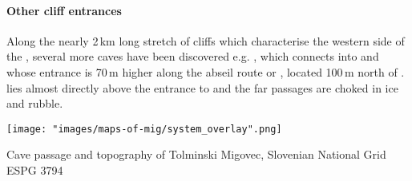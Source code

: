 \paragraph{Other cliff entrances} Along the nearly 2\,km long stretch of cliffs which characterise the western side of the , several more caves have been discovered e.g. , which connects into  and whose entrance is 70\,m higher along the abseil route or , located 100\,m north of .  lies almost directly above the entrance to  and the far passages are choked in ice and rubble.

\begin{pagemap}
 \checkoddpage \ifoddpage \forcerectofloat \else \forceversofloat \fi
\centering
  \texttt{[image: "images/maps-of-mig/system\_overlay".png]}
  \caption{Cave passage and topography of Tolminski Migovec, Slovenian National Grid ESPG 3794}
   \label{map:map overlay}
 \end{pagemap}